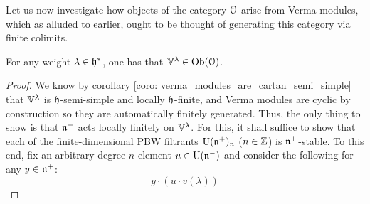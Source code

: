         Let us now investigate how objects of the category $\mathcal{O}$ arise from Verma modules, which as alluded to earlier, ought to be thought of generating this category via finite colimits.
        \begin{lemma} \label{lemma: verma_modules_are_in_category_O}
            For any weight $\lambda \in \mathfrak{h}^*$, one has that $\mathbb{V}^{\lambda} \in \mathrm{Ob}(\mathcal{O})$.
        \end{lemma}
            \begin{proof}
                We know by corollary \ref{coro: verma_modules_are_cartan_semi_simple} that $\mathbb{V}^{\lambda}$ is $\mathfrak{h}$-semi-simple and locally $\mathfrak{h}$-finite, and Verma modules are cyclic by construction so they are automatically finitely generated. Thus, the only thing to show is that $\mathfrak{n}^+$ acts locally finitely on $\mathbb{V}^{\lambda}$. For this, it shall suffice to show that each of the finite-dimensional PBW filtrants $\mathrm{U}(\mathfrak{n}^+)_n$ ($n \in \mathbb{Z}$) is $\mathfrak{n}^+$-stable. To this end, fix an arbitrary degree-$n$ element $u \in \mathrm{U}(\mathfrak{n}^-)$ and consider the following for any $y \in \mathfrak{n}^+$:
                    $$y \cdot (u \cdot v(\lambda))$$
            \end{proof}